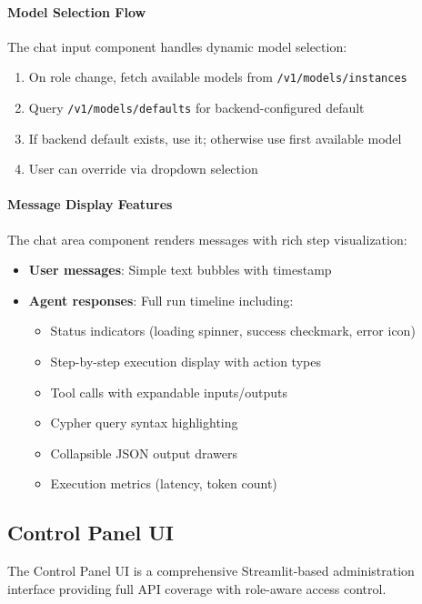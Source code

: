 \paragraph{Model Selection Flow}
The chat input component handles dynamic model selection:
\begin{enumerate}
    \item On role change, fetch available models from \texttt{/v1/models/instances}
    \item Query \texttt{/v1/models/defaults} for backend-configured default
    \item If backend default exists, use it; otherwise use first available model
    \item User can override via dropdown selection
\end{enumerate}

\paragraph{Message Display Features}
The chat area component renders messages with rich step visualization:
\begin{itemize}
    \item \textbf{User messages}: Simple text bubbles with timestamp
    \item \textbf{Agent responses}: Full run timeline including:
    \begin{itemize}
        \item Status indicators (loading spinner, success checkmark, error icon)
        \item Step-by-step execution display with action types
        \item Tool calls with expandable inputs/outputs
        \item Cypher query syntax highlighting
        \item Collapsible JSON output drawers
        \item Execution metrics (latency, token count)
    \end{itemize}
\end{itemize}

\subsection{Control Panel UI}
\label{subsec:control-panel-ui}

The Control Panel UI is a comprehensive Streamlit-based administration interface providing full API coverage with role-aware access control.

